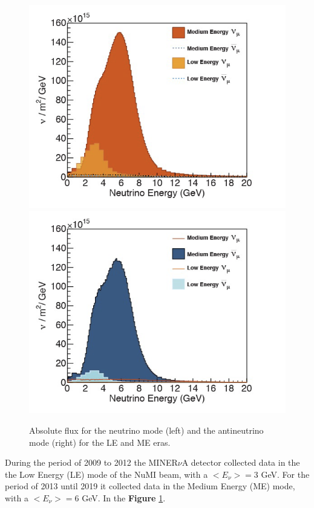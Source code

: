 \begin{figure}[!htb]
\centering
\includegraphics[scale=0.38]{Figures/Chapter2/fluxantineutrino.png}\includegraphics[scale=0.38]{Figures/Chapter2/fluxneutrino.png}
        \caption{Absolute flux for the neutrino mode (left) and the antineutrino mode (right) for the LE and ME eras.} 
\label{fig:MnvExp:NuMI:Flux}
\end{figure}

During the period of 2009 to 2012 the MINER$\nu$A detector collected data in the the Low Energy (LE) mode of the NuMI beam, with a $<E_\nu> = 3$ GeV. For the period of 2013 until 2019 it collected data in the Medium Energy (ME) mode, with a $<E_\nu> = 6$ GeV.  In the \textbf{Figure} \ref{fig:MnvExp:NuMI:Flux}.



